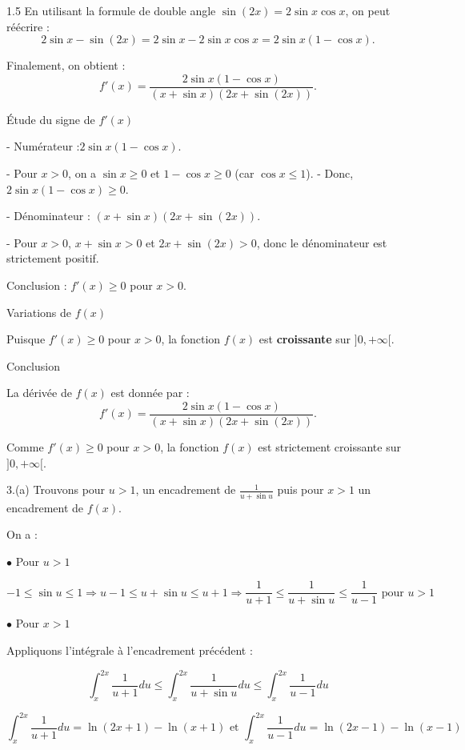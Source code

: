 \documentclass[12pt]{article}
\begin{document}
\begin{spacing}{1.5}
En utilisant la formule de double angle \( \sin(2x) = 2\sin x \cos x \), on peut réécrire :
\[
2\sin x - \sin(2x) = 2\sin x - 2\sin x \cos x = 2\sin x(1 - \cos x).
\]

Finalement, on obtient :
\[
f'(x) = \frac{2\sin x(1 - \cos x)}{(x + \sin x)(2x + \sin(2x))}.
\]

Étude du signe de \( f'(x) \)

- Numérateur :\( 2\sin x(1 - \cos x) \).

  - Pour \( x > 0 \), on a \( \sin x \geq 0 \) et \( 1 - \cos x \geq 0 \) (car \( \cos x \leq 1 \)).
  - Donc, \( 2\sin x(1 - \cos x) \geq 0 \).

- Dénominateur : \( (x + \sin x)(2x + \sin(2x)) \).

  - Pour \( x > 0 \), \( x + \sin x > 0 \) et \( 2x + \sin(2x) > 0 \), donc le dénominateur est strictement positif.

Conclusion : \( f'(x) \geq 0 \) pour \( x > 0 \).

 Variations de \( f(x) \)

Puisque \( f'(x) \geq 0 \) pour \( x > 0 \), la fonction \( f(x) \) est \textbf{croissante} sur \( ]0, +\infty[ \).

Conclusion

 La dérivée de \( f(x) \) est donnée par :
\[
f'(x) = \frac{2\sin x(1 - \cos x)}{(x + \sin x)(2x + \sin(2x))}.
\]

 Comme \( f'(x) \geq 0 \) pour \( x > 0 \), la fonction \( f(x) \) est strictement croissante sur \( ]0, +\infty[ \).

 
 

 
 3.(a) Trouvons pour $u>1$, un encadrement de $\frac{1}{u+\sin u}$ puis pour $x>1$ un encadrement de $f(x)$.
 
 On a :
 
 $\bullet$ Pour $u>1$
 
 \[-1\leq \sin u\leq 1\Rightarrow u-1\leq u+\sin u\leq u+1\Rightarrow \frac{1}{u+1}\leq \frac{1}{u+\sin u}\leq \frac{1}{u-1} \text{ pour } u> 1\] 
 
 \medskip
 $\bullet$ Pour $x>1$
 
 Appliquons l'intégrale à l'encadrement précédent :
 
 \[
 \int_{x}^{2x}\frac{1}{u+1}du\leq \int_{x}^{2x}\frac{1}{u+\sin u}du\leq \int_{x}^{2x}\frac{1}{u-1}du\]
 
 \[\int_{x}^{2x}\frac{1}{u+1}du=\ln(2x+1)-\ln(x+1) \text{ et } \int_{x}^{2x}\frac{1}{u-1}du=\ln(2x-1)-\ln(x-1)\]
 

\end{spacing}
\end{document}
